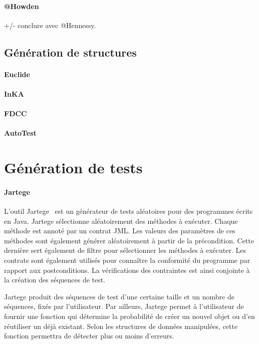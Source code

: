 \paragraph{@Howden}

+/- conclure avec @Hennessy.

\subsection{Génération de structures}

\paragraph{Euclide}

\paragraph{InKA}

\paragraph{FDCC}

\paragraph{AutoTest}

\section{Génération de tests}

\paragraph{Jartege} L'outil Jartege~ est un générateur de tests
aléatoires pour des programmes écrits en Java. Jartege sélectionne aléatoirement
des méthodes à exécuter. Chaque méthode est annoté par un contrat JML. Les
valeurs des paramètres de ces méthodes sont également générer aléatoirement à
partir de la précondition. Cette dernière sert également de filtre pour
sélectionner les méthodes à exécuter. Les contrats sont également utilisés pour
connaître la conformité du programme par rapport aux postconditions. La
vérifications des contraintes est ainsi conjointe à la création des séquences de
test.

Jartege produit des séquences de test d'une certaine taille et un nombre de
séquences, fixés par l'utilisateur. Par ailleurs, Jartege permet à l'utilisateur
de fournir une fonction qui détermine la probabilité de créer un nouvel objet ou
d'en réutiliser un déjà existant. Selon les structures de données manipulées,
cette fonction permettra de détecter plus ou moins d'erreurs.

